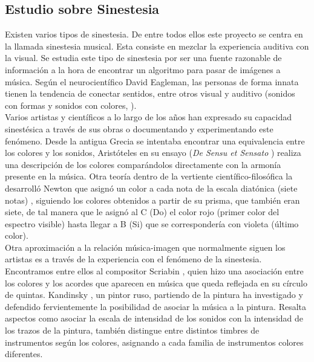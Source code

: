 \subsection{Estudio sobre Sinestesia}
\label{subsubsec:estudioSinestesia}


Existen varios tipos de sinestesia. De entre todos ellos este proyecto se centra en la llamada sinestesia musical. Esta consiste en mezclar la experiencia auditiva con la visual. Se estudia este tipo de sinestesia por ser una fuente razonable de información a la hora de encontrar un algoritmo para pasar de imágenes a música. Según el neurocientífico David Eagleman, las personas de forma innata tienen la tendencia de conectar sentidos, entre otros visual y auditivo (sonidos con formas y sonidos con colores, \cite{VideoRedesFliparColores}).\\

Varios artistas y científicos a lo largo de los años han expresado su capacidad sinestésica a través de sus obras o documentando y experimentando este fenómeno. Desde la antigua Grecia se intentaba encontrar una equivalencia entre los colores y los sonidos, Aristóteles en su ensayo (\emph{De Sensu et Sensato} \cite{DeSensuEtSensato}) realiza una descripción de los colores comparándolos directamente con la armonía presente en la música. Otra teoría dentro de la vertiente científico-filosófica la desarrolló Newton que asignó un color a cada nota de la escala diatónica (siete notas) \cite{OpticksNewton}, siguiendo los colores obtenidos a partir de su prisma, que también eran siete, de tal manera que le asignó al C (Do) el color rojo (primer color del espectro visible) hasta llegar a B (Si) que se correspondería con violeta (último color).\\ 

Otra aproximación a la relación música-imagen que normalmente siguen los artistas es a través de la experiencia con el fenómeno de la sinestesia. Encontramos entre ellos al compositor Scriabin \cite{ScriabinQuintasColor}, quien hizo una asociación entre los colores y los acordes que aparecen en música que queda reflejada en su círculo de quintas. Kandinsky \cite{ConcerningSpiritualArt}, un pintor ruso, partiendo de la pintura ha investigado y defendido fervientemente la posibilidad de asociar la música a la pintura. Resalta aspectos como asociar la escala de intensidad de los sonidos con la intensidad de los trazos de la pintura, también distingue entre distintos timbres de instrumentos según los colores, asignando a cada familia de instrumentos colores diferentes.\\

